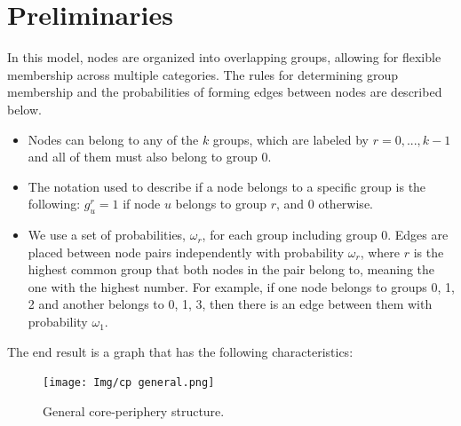\documentclass[sigconf]{acmart}
\begin{document}
\section{Preliminaries}

In this model, nodes are organized into overlapping groups, allowing for flexible membership across multiple categories. The rules for determining group membership and the probabilities of forming edges between nodes are described below. \\
\begin{itemize}
    \item Nodes can belong to any of the $k$ groups, which are labeled by $r = 0, ..., k - 1$ and all of them must also belong to group 0.
    \item The notation used to describe if a node belongs to a specific group is the following: $g_u^r = 1$ if node $u$ belongs to group $r$, and $0$ otherwise.
    \item We use a set of probabilities, $\omega_r$, for each group including group 0. Edges are placed between node pairs independently with probability $\omega_r$, where $r$ is the highest common group that both nodes in the pair belong to, meaning the one with the highest number. For example, if one node belongs to groups 0, 1, 2 and another belongs to 0, 1, 3, then there is an edge between them with probability $\omega_1$.
\end{itemize}
\vspace{0.3cm}
The end result is a graph that has the following characteristics:
\FloatBarrier
\begin{figure}[h]
    \centering
    \texttt{[image: Img/cp general.png]}
    \caption{General core-periphery structure.}
    \label{fig:general cp}
\end{figure}
\FloatBarrier
{}
\end{document}
